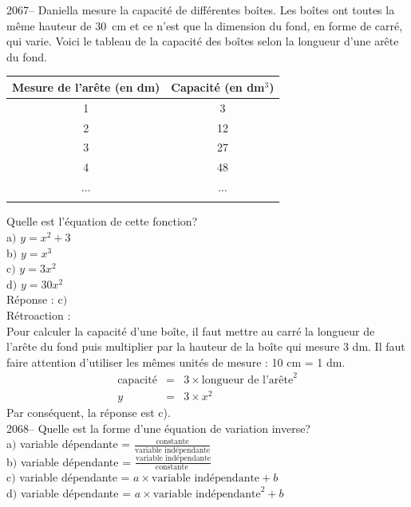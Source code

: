 \documentclass[letterpaper, 12pt]{article}
\begin{document}
2067-- Daniella mesure la capacit\'e de diff\'erentes bo\^ites. Les bo\^ites ont toutes la m\^eme hauteur de \mbox{30 cm} et ce n'est que la dimension du fond, en forme de carr\'e, qui varie. Voici le tableau de la capacit\'e des bo\^ites selon la longueur d'une ar\^ete du fond.
\begin{center}
 \begin{tabular}{|c|c|} \hline
{\bf Mesure de l'ar\^ete (en dm)} & {\bf Capacit\'e (en dm$^{3}$)}\\ \hline \hline
1 & 3 \\ \hline
2 & 12 \\ \hline
3 & 27 \\ \hline
4 & 48 \\ \hline
$\ldots$ & $\ldots$ \\ \hline
\multicolumn{2}{c}{}\\
\end{tabular}
\end{center}
Quelle est l'\'equation de cette fonction?\\

a$)$ $y = x^{2} + 3$\\
b$)$ $y = x^{3}$ \\
c$)$ $y = 3x^{2}$\\
d$)$ $y = 30x^{2}$\\

R\'eponse : c$)$\\

R\'etroaction :\\
Pour calculer la capacit\'e d'une bo\^ite, il faut mettre au carr\'e la longueur de l'ar\^ete du fond puis multiplier par la hauteur de la bo\^ite qui mesure 3 dm. Il faut faire attention d'utiliser les m\^emes unit\'es de mesure : 10 cm = 1 dm.
\begin{eqnarray*}
 \textrm{capacit\'e} &=& 3 \times \textrm{longueur de l'ar\^ete}^{2}\\
  y &=& 3 \times x^{2}
\end{eqnarray*}
Par cons\'equent, la r\'eponse est c).\\


2068-- Quelle est la forme d'une \'equation de variation inverse? \\

a$)$ variable d\'ependante = $\frac{\textrm{constante}}{\textrm{variable ind\'ependante}}$\\ [2mm]
b$)$ variable d\'ependante = $\frac{\textrm{variable ind\'ependante}}{\textrm{constante }}$\\ [2mm]
c$)$ variable d\'ependante = $ a \times \textrm{variable ind\'ependante} + b $\\ [2mm]
d$)$ variable d\'ependante = $ a \times \textrm{variable ind\'ependante}^{2} + b $\\ [2mm]
\end{document}
